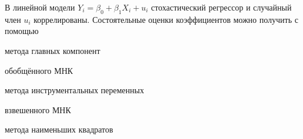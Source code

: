 
\begin{question}
В линейной модели \(Y_i = \beta_0 + \beta_1 X_i + u_i\) стохастический регрессор
и случайный член \(u_i\) коррелированы. Состоятельные оценки коэффициентов можно получить
с помощью
\begin{answerlist}
  \item метода главных компонент
  \item обобщённого МНК
  \item метода инструментальных переменных
  \item взвешенного МНК
  \item метода наименьших квадратов
\end{answerlist}
\end{question}


